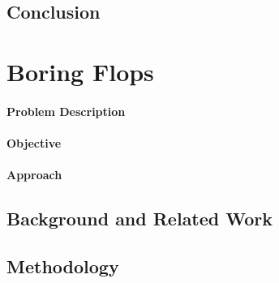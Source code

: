 \documentclass[a4paper]{article}
\begin{document}


\subsection{Conclusion} %
\label{sec:SimpleAlways_conclusion}



\section{Boring Flops} %
\label{sec:BoringFlops}

\paragraph{Problem Description} %
\label{sec:BoringFlops_problem}


\paragraph{Objective} %
\label{sec:BoringFlops_objective}


\paragraph{Approach} %
\label{sec:BoringFlops_approach}


\subsection{Background and Related Work} %
\label{sec:BoringFlops_background}


\subsection{Methodology} %
\label{sec:BoringFlops_methodology}

\end{document}
